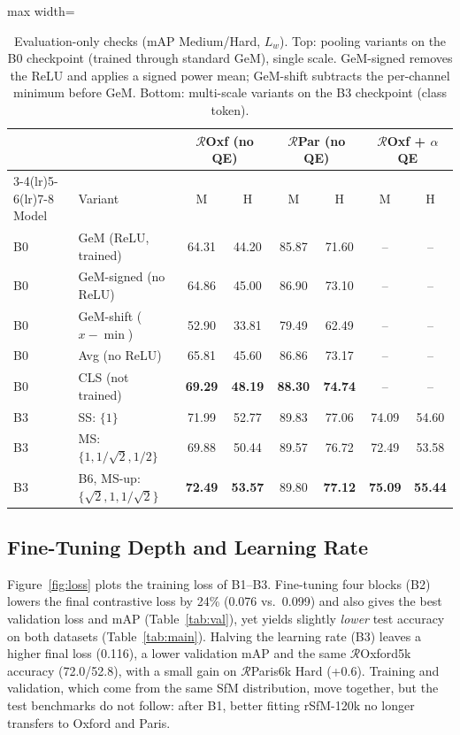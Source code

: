 \documentclass[runningheads]{llncs}
\newcommand{\roxf}{$\mathcal{R}$Oxford5k}
\newcommand{\rpar}{$\mathcal{R}$Paris6k}
\newcommand{\roxs}{$\mathcal{R}$Oxf}
\newcommand{\rpas}{$\mathcal{R}$Par}
\newcommand{\aqe}{$\alpha$QE}
\newcommand{\best}[1]{\textbf{#1}}
\begin{document}
\begin{table}[t]
\centering
\caption{Evaluation-only checks (mAP Medium/Hard, $L_w$). Top: pooling variants
on the B0 checkpoint (trained through standard GeM), single scale. GeM-signed
removes the ReLU and applies a signed power mean; GeM-shift subtracts the
per-channel minimum before GeM. Bottom: multi-scale variants on the B3
checkpoint (class token).}
\label{tab:ablation}
\setlength{\tabcolsep}{4pt}
\begin{adjustbox}{max width=\textwidth}
\begin{tabular}{@{}llcccccc@{}}
\toprule
 & & \multicolumn{2}{c}{\roxs{} (no QE)} & \multicolumn{2}{c}{\rpas{} (no QE)} & \multicolumn{2}{c}{\roxs{} + \aqe{}}\\
\cmidrule(lr){3-4}\cmidrule(lr){5-6}\cmidrule(lr){7-8}
Model & Variant & M & H & M & H & M & H \\
\midrule
B0 & GeM (ReLU, trained) & 64.31 & 44.20 & 85.87 & 71.60 & -- & -- \\
B0 & GeM-signed (no ReLU) & 64.86 & 45.00 & 86.90 & 73.10 & -- & -- \\
B0 & GeM-shift ($x-\min$) & 52.90 & 33.81 & 79.49 & 62.49 & -- & -- \\
B0 & Avg (no ReLU) & 65.81 & 45.60 & 86.86 & 73.17 & -- & -- \\
B0 & CLS (not trained) & \best{69.29} & \best{48.19} & \best{88.30} & \best{74.74} & -- & -- \\
\midrule
B3 & SS: $\{1\}$ & 71.99 & 52.77 & 89.83 & 77.06 & 74.09 & 54.60 \\
B3 & MS: $\{1,1/\sqrt2,1/2\}$ & 69.88 & 50.44 & 89.57 & 76.72 & 72.49 & 53.58 \\
B3 & B6, MS-up: $\{\sqrt2,1,1/\sqrt2\}$ & \best{72.49} & \best{53.57} & 89.80 & \best{77.12} & \best{75.09} & \best{55.44} \\
\bottomrule
\end{tabular}
\end{adjustbox}
\end{table}

\subsection{Fine-Tuning Depth and Learning Rate}

Figure~\ref{fig:loss} plots the training loss of B1--B3. Fine-tuning four
blocks (B2) lowers the final contrastive loss by 24\% (0.076 vs.\ 0.099) and
also gives the best validation loss and mAP (Table~\ref{tab:val}), yet yields
slightly \emph{lower} test accuracy on both datasets (Table~\ref{tab:main}).
Halving the learning rate (B3) leaves a higher final loss (0.116), a lower
validation mAP and the same \roxf{} accuracy (72.0/52.8), with a small gain on
\rpar{} Hard (+0.6). Training and validation, which come from the same SfM
distribution, move together, but the test benchmarks do not follow: after B1,
better fitting rSfM-120k no longer transfers to Oxford and Paris.
\end{document}
